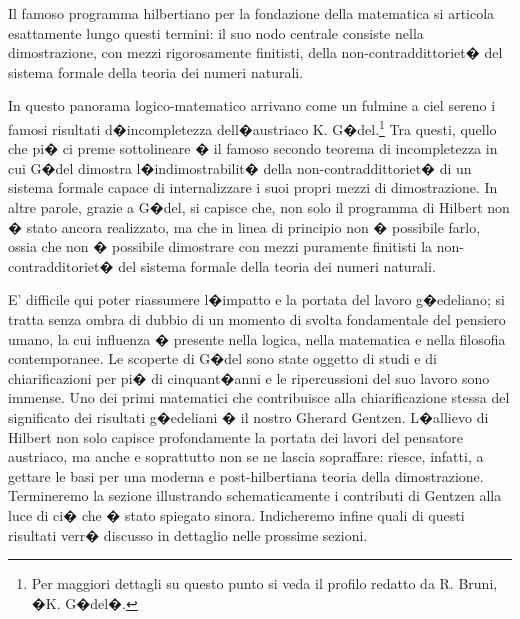 \documentclass[a4paper,12pt]{aphex}
\begin{document}
Il famoso programma hilbertiano per la fondazione della matematica si articola esattamente lungo questi termini: il suo nodo centrale consiste nella dimostrazione, con mezzi rigorosamente finitisti, della non-contraddittoriet� del sistema formale della teoria dei numeri naturali. 


In questo panorama logico-matematico arrivano come un fulmine a ciel sereno i famosi risultati d�incompletezza dell�austriaco K. G�del.\footnote{Per maggiori dettagli su questo punto si veda il profilo redatto da R. Bruni, �K. G�del�.}  Tra questi, quello che pi� ci preme sottolineare � il famoso  secondo teorema di incompletezza in cui G�del dimostra l�indimostrabilit� della non-contraddittoriet� di un sistema formale capace di internalizzare i suoi propri mezzi di dimostrazione.  In altre parole, grazie a G�del, si capisce che, non solo il programma di Hilbert non � stato ancora realizzato, ma che in linea di principio non � possibile farlo, ossia che non � possibile dimostrare con mezzi puramente finitisti la non-contradditoriet� del sistema formale della teoria dei numeri naturali. 
 
E' difficile qui poter riassumere l�impatto e la portata del lavoro g�edeliano; si tratta senza ombra di dubbio  di un momento di svolta fondamentale del pensiero umano, la cui influenza � presente nella logica, nella matematica e nella filosofia contemporanee. Le scoperte di G�del sono state oggetto di studi e di chiarificazioni per pi� di cinquant�anni e le ripercussioni del suo lavoro sono immense. 
Uno dei primi matematici che contribuisce alla chiarificazione stessa del significato dei risultati g�edeliani � il nostro Gherard Gentzen. L�allievo di Hilbert non solo capisce profondamente la portata dei lavori del pensatore austriaco, ma anche e soprattutto non se ne lascia sopraffare: riesce, infatti, a gettare le basi per una moderna e post-hilbertiana teoria della dimostrazione. Termineremo la sezione illustrando schematicamente i contributi di Gentzen alla luce di ci� che � stato spiegato sinora. Indicheremo infine quali di questi risultati verr�  discusso in dettaglio nelle prossime sezioni.
\end{document}
